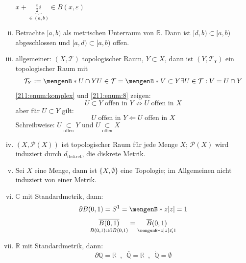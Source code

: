 \begin{enumerate}[(i)]
	\begin{figure}[ht]
	\end{figure}
	$x + \underbrace{\frac{\varepsilon}{2} i}_{\in (a,b)} \in B(x, \varepsilon) $
	\item \label{211:enum:8} Betrachte $[a,b)$ als metrischen Unterraum von $\mathds{R}$. Dann ist $[d,b) \subset [a,b)$ abgeschlossen und $[a,d) \subset [a,b)$ offen.
	\item allgemeiner: $(X,\mathcal{T})$ topologischer Raum, $Y \subset X$, dann ist $(Y, \mathcal{T}_Y)$ ein topologischer Raum mit 
	\[
		\mathcal{T}_Y := \set[U \cap Y]{U \in \mathcal{T}} = \set[V \subset Y]{\exists U \in \mathcal{T} : V = U  \cap Y} 
	\]
	\ref{211:enum:komplex} und \ref{211:enum:8} zeigen:
	\[
		U \subset Y \text{ offen in }Y \not\Rightarrow U \text{ offen in } X
	\]
	aber für $U \subset Y$ gilt: 
	\[
		U \text{ offen in } Y \Leftarrow U \text{ offen in } X
	\]
	Schreibweise: $U \underset{\text{offen}}{\subset} Y$ und $U \underset{\text{offen}}{\subset} X$
	\item $(X, \mathcal{P}(X))$ ist topologischer Raum für jede Menge $X$; $\mathcal{P}(X)$ wird induziert durch $d_{\text{diskret}}$, die diskrete Metrik.
	\item Sei $X$ eine Menge, dann ist $\{X, \emptyset \}$ eine Topologie; im Allgemeinen nicht induziert von einer Metrik.
	\item $\mathds{C}$ mit Standardmetrik, dann:
	\[
		\partial B(0,1) = S^1 = \set[z]{\abs*{z}=1} 
	\]
	\[
		\underset{B(0,1) \cup \partial B(0,1)}{\overline{B(0,1)}} = \underset{ \set[z]{\abs*{z}  \le 1 } }{\overline{B}(0,1)}
	\]
	\item $\mathds{R}$ mit Standardmetrik, dann:
	\[
		\partial \mathds{Q} = \mathds{R} \enspace, \enspace \overline{\mathds{Q}} = \mathds{R} \enspace, \enspace \mathring{\mathds{Q}}= \emptyset 
	\]
\end{enumerate}

